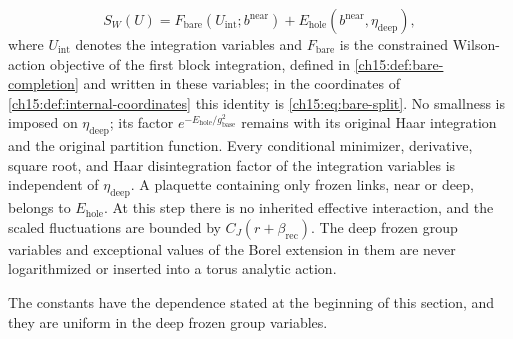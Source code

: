 \begin{theorem}
\begin{enumerate}
\[
 S_W(U)=F_{\mathrm{bare}}(U_{\mathrm{int}};b^{\mathrm{near}})
                 +E_{\mathrm{hole}}(b^{\mathrm{near}},\eta_{\mathrm{deep}}),
\]
where $U_{\mathrm{int}}$ denotes the integration variables and $F_{\mathrm{bare}}$ is the constrained Wilson-action objective of the first block integration, defined in \cref{ch15:def:bare-completion} and written in these variables; in the coordinates of \cref{ch15:def:internal-coordinates} this identity is \eqref{ch15:eq:bare-split}. No smallness is imposed on $\eta_{\mathrm{deep}}$; its factor $e^{-E_{\mathrm{hole}}/g_{\mathrm{base}}^2}$ remains with its original Haar integration and the original partition function. Every conditional minimizer, derivative, square root, and Haar disintegration factor of the integration variables is independent of $\eta_{\mathrm{deep}}$. A plaquette containing only frozen links, near or deep, belongs to $E_{\mathrm{hole}}$. At this step there is no inherited effective interaction, and the scaled fluctuations are bounded by $C_J(r+\beta_{\mathrm{rec}})$. The deep frozen group variables and exceptional values of the Borel extension in them are never logarithmized or inserted into a torus analytic action.
\end{enumerate}
The constants have the dependence stated at the beginning of this section, and they are uniform in the deep frozen group variables.
\end{theorem}

